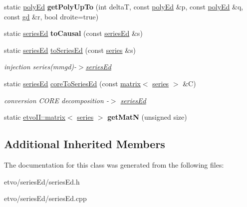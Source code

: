 \begin{DoxyCompactItemize}
\item 
\mbox{\label{classetvo_i_i_1_1series_ed_a649ece302bf7a45481c450c2d7b1b3f1}} 
static \mbox{\hyperlink{classetvo_i_i_1_1poly_ed}{poly\+Ed}} {\bfseries get\+Poly\+Up\+To} (int deltaT, const \mbox{\hyperlink{classetvo_i_i_1_1poly_ed}{poly\+Ed}} \&p, const \mbox{\hyperlink{classetvo_i_i_1_1poly_ed}{poly\+Ed}} \&q, const \mbox{\hyperlink{classetvo_i_i_1_1gd}{gd}} \&r, bool droite=true)
\item 
\mbox{\label{classetvo_i_i_1_1series_ed_a50c626579b815738e979fd9a22803b53}} 
static \mbox{\hyperlink{classetvo_i_i_1_1series_ed}{series\+Ed}} {\bfseries to\+Causal} (const \mbox{\hyperlink{classetvo_i_i_1_1series_ed}{series\+Ed}} \&s)
\item 
\mbox{\label{classetvo_i_i_1_1series_ed_acbeea1cf1adea319ccd09b306c0e32de}} 
static \mbox{\hyperlink{classetvo_i_i_1_1series_ed}{series\+Ed}} \mbox{\hyperlink{classetvo_i_i_1_1series_ed_acbeea1cf1adea319ccd09b306c0e32de}{to\+Series\+Ed}} (const \mbox{\hyperlink{classetvo_i_i_1_1series}{series}} \&s)
\begin{DoxyCompactList}\small\item\em injection series(mmgd)-\/$>$\mbox{\hyperlink{classetvo_i_i_1_1series_ed}{series\+Ed}} \end{DoxyCompactList}\item 
\mbox{\label{classetvo_i_i_1_1series_ed_af5ecb82703d6d70f9934f1a87a71ecc0}} 
static \mbox{\hyperlink{classetvo_i_i_1_1series_ed}{series\+Ed}} \mbox{\hyperlink{classetvo_i_i_1_1series_ed_af5ecb82703d6d70f9934f1a87a71ecc0}{core\+To\+Series\+Ed}} (const \mbox{\hyperlink{classetvo_i_i_1_1matrix}{matrix}}$<$ \mbox{\hyperlink{classetvo_i_i_1_1series}{series}} $>$ \&C)
\begin{DoxyCompactList}\small\item\em conversion C\+O\+RE decomposition -\/$>$ \mbox{\hyperlink{classetvo_i_i_1_1series_ed}{series\+Ed}} \end{DoxyCompactList}\item 
\mbox{\label{classetvo_i_i_1_1series_ed_a3aa0bf3e47c852e5a4095de23fc3dd19}} 
static \mbox{\hyperlink{classetvo_i_i_1_1matrix}{etvo\+I\+I\+::matrix}}$<$ \mbox{\hyperlink{classetvo_i_i_1_1series}{series}} $>$ {\bfseries get\+MatN} (unsigned size)
\end{DoxyCompactItemize}
\subsection*{Additional Inherited Members}


The documentation for this class was generated from the following files\+:\begin{DoxyCompactItemize}
\item 
etvo/series\+Ed/series\+Ed.\+h\item 
etvo/series\+Ed/series\+Ed.\+cpp\end{DoxyCompactItemize}
